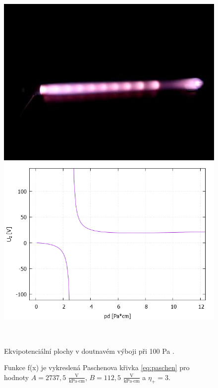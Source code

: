 \begin{figure}[h!]
\centering
\begin{minipage}[c]{200pt}
\includegraphics[width=\textwidth]{Figure/02/doutnavy.png}
\end{minipage}
\begin{minipage}[c]{200pt}
\includegraphics[width=\textwidth]{Figure/02/paschen_moje.png}
\end{minipage}
\\
\begin{minipage}[c]{200pt}
\caption{Ekvipotenciální plochy v doutnavém výboji při 100 Pa \cite{edu-techmania}.  }
\label{obr:doutnavy}
\end{minipage}
\begin{minipage}[c]{5pt}
\end{minipage}
\begin{minipage}[c]{200pt}
\caption{ Funkce f(x) je vykreslená Paschenova křivka \eqref{eq:paschen} pro hodnoty $A=2737,5$ $\frac{\text{V}}{\text{kPa} \cdot \text{cm}}$, $B=112,5$ $\frac{\text{V}}{\text{kPa} \cdot \text{cm}}$ a $\eta_+=3$.}
\label{obr:paschen_moje}
\end{minipage}
\end{figure}


